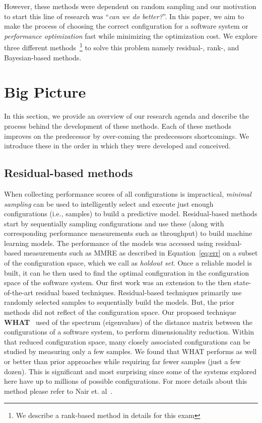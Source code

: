 \documentclass[sigconf]{acmart}
\begin{document}
However, these methods were dependent on random sampling and our motivation to start this line of research was ``\textit{can we do better?}''.
In this paper, we aim to make the process of choosing the correct configuration for a software system or \textit{performance optimization} fast while minimizing the optimization cost.  We explore three different methods~\footnote{We describe a rank-based method in details for this exam} to solve this problem namely residual-, rank-, and Bayesian-based methods. 

\section{Big Picture}
In this section, we provide an overview of our research agenda and describe the process behind the development of these methods. Each of these methods improves on the predecessor by over-coming the predecessor\textquotesingle s shortcomings. We introduce these in the order in which they were developed and conceived.
\subsection{Residual-based methods}
When collecting performance scores of all configurations is impractical,  {\em minimal sampling} 
 can be used to intelligently select and execute just enough configurations (i.e., samples) to build a
 predictive model.
 Residual-based methods start by sequentially sampling configurations and use these (along with corresponding performance measurements such as throughput) to build machine learning models. 
 The performance of the models was accessed using residual-based measurements such as MMRE as described in Equation~\ref{eq:err} on a subset of the configuration space, which we call as \textit{holdout set}. 
 Once a reliable model is built, it can be then used to find the optimal configuration in the configuration space of the software system. Our first work was an extension to the then state-of-the-art residual based techniques. Residual-based techniques primarily use randomly selected samples to sequentially build the models. But, the prior methods did not reflect of the configuration space. Our proposed technique \textbf{WHAT}~\cite{nair2017faster} used of the spectrum (eigenvalues) of the distance matrix between the configurations of a software system, to perform dimensionality reduction. Within that
reduced configuration space, many closely associated configurations can be studied by measuring only a few samples. We found that WHAT performs as well or better than prior approaches while requiring far fewer samples (just a few dozen). This is significant and most surprising since some of the systems explored here have up to millions of possible configurations. For more details about this method please refer to Nair et. al~\cite{nair2017faster}.
\end{document}
